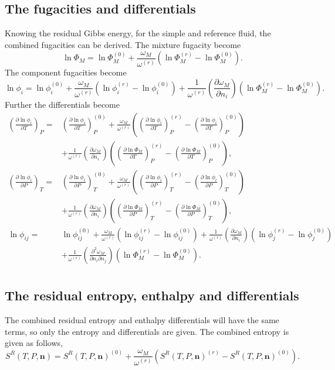 \documentclass[internal,english]{sintefmemo2012}
\numberwithin{equation}{section}
\newcommand*{\pder}[2]{\left(\frac{\partial #1}{\partial #2}\right)}
\newcommand*{\pdcross}[3]{\left(\frac{\partial^2 #1}{\partial #2 \partial #3}\right)}
\begin{document}
\subsection{The fugacities and differentials}
Knowing the residual Gibbs energy, for the simple and reference fluid,
the combined fugacities can be derived. The mixture fugacity become
\begin{equation}
\label{eq:LK_fugacity}
\ln \Phi_M = \ln \Phi_M^{(0)} + \frac{\omega_M}{\omega^{(r)}}\left(\ln \Phi_M^{(r)} - \ln \Phi_M^{(0)}\right).
\end{equation}
The component fugacities become
\begin{equation}
\label{eq:LK_comp_fugacity}
\ln \phi_i = \ln \phi_i^{(0)} + \frac{\omega_M}{\omega^{(r)}}\left(\ln
\phi_i^{(r)} - \ln \phi_i^{(0)}\right) + \frac{1}{\omega^{(r)}}\pder{\omega_M}{n_i}\left(\ln \Phi_M^{(r)} - \ln \Phi_M^{(0)}\right).
\end{equation}
Further the differentials become
\begin{align}
\label{eq:LK_comp_fugacity_diff}
\pder{\ln \phi_i}{T}_{P} =& \pder{\ln \phi_i}{T}_{P}^{(0)} +
\frac{\omega_M}{\omega^{(r)}}\left(\pder{\ln \phi_i}{T}_{P}^{(r)} -
\pder{\ln \phi_i}{T}_{P}^{(0)}\right) \\
&+ \frac{1}{\omega^{(r)}}\pder{\omega_M}{n_i}\left(\pder{\ln
  \Phi_M}{T}_{P}^{(r)} - \pder{\ln \Phi_M}{T}_{P}^{(0)}\right), \\
\pder{\ln \phi_i}{P}_{T} =& \pder{\ln \phi_i}{P}_{T}^{(0)} +
\frac{\omega_M}{\omega^{(r)}}\left(\pder{\ln \phi_i}{P}_{T}^{(r)} -
\pder{\ln \phi_i}{P}_{T}^{(0)}\right) \\ 
&+ \frac{1}{\omega^{(r)}}\pder{\omega_M}{n_i}\left(\pder{\ln
  \Phi_M}{P}_{T}^{(r)} - \pder{\ln \Phi_M}{P}_{T}^{(0)}\right), \\
\ln \phi_{ij} =& \ln \phi_{ij}^{(0)} +
\frac{\omega_M}{\omega^{(r)}}\left(\ln \phi_{ij}^{(r)} - \ln
\phi_{ij}^{(0)}\right) + \frac{1}{\omega^{(r)}}\pder{\omega_M}{n_i}\left(\ln
\phi_j^{(r)} - \ln \phi_j^{(0)}\right)\\ 
& + \frac{1}{\omega^{(r)}}\pdcross{\omega_M}{n_i}{n_j}\left(\ln \Phi_M^{(r)} - \ln
\Phi_M^{(0)}\right). \\
\end{align}

\subsection{The residual entropy, enthalpy and differentials}
The combined residual entropy and enthalpy differentials will have the
same terms, so only the entropy and differentials are given. The
combined entropy is given as follows,
\begin{equation}
\label{eq:LK_entropy}
S^R(T,P,\textbf{n}) = S^R(T,P,\textbf{n})^{(0)} + \frac{\omega_M}{\omega^{(r)}}\left(S^R(T,P,\textbf{n})^{(r)} - S^R(T,P,\textbf{n})^{(0)}\right).
\end{equation}
\end{document}
